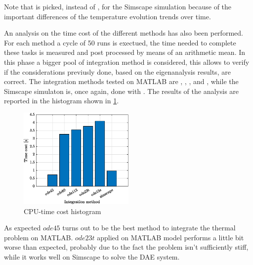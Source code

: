 \documentclass[11pt,a4paper,oneside]{article}
\begin{document}
Note that  is picked, instead of , for the Simscape simulation because of the important differences of the temperature evolution trends over time.

An analysis on the time cost of the different methods has also been performed.
For each method a cycle of 50 runs is exectued, the time needed to complete these tasks is measured and post processed by means of an arithmetic mean.
In this phase a bigger pool of integration method is considered, this allows to verify if the considerations previusly done, based on the eigenanalysis results, are correct.
The integration methods tested on MATLAB are , , ,  and , while the Simscape simulaton is, once again, done with .
The results of the analysis are reported in the histogram shown in \cref{fig:ex1_CPUtime}.
\begin{figure}[H]
    \centering
    \includegraphics*[width=0.5\textwidth, keepaspectratio]{Figures/ex1_CPUtime.eps}
    \caption[]{\label{fig:ex1_CPUtime} CPU-time cost histogram}
\end{figure}

As expected $ode45$ turns out to be the best method to integrate the thermal problem on MATLAB.
$ode23t$ applied on MATLAB model performs a little bit worse than expected, probably due to the fact the problem isn't sufficiently stiff, while it works well on Simscape to solve the DAE system.
\end{document}
